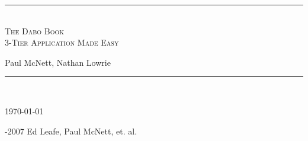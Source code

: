 \documentclass[letterpaper,10pt]{RevisedBook}
\newcommand{\titlerule}{\rule{\linewidth}{1.5mm}}
\renewcommand{\title}{The Dabo Book}				%
\newcommand{\subtitle}{3-Tier Application Made Easy}	%
\renewcommand{\author}{Paul McNett, Nathan Lowrie}					%
\newcommand{\copyrightHolder}{Ed Leafe, Paul McNett, et. al.}	%
\begin{document}
\frontmatter									%

\begin{titlepage}
    \thispagestyle{empty}
    \begin{center}
    \end{center}
    \begin{center}
        \titlerule\\[3mm]
        \Huge \textsc{\title\\\subtitle}\\[5mm]		%
        \begin{center}
		\huge \author\\[3.5mm]						%
    	\end{center}
       	\titlerule\\
    \end{center}
    \scriptsize \today
    \begin{center}
        -2007 \copyrightHolder			%
    \end{center}
\end{titlepage}

\pagestyle{fancy}                         %
\end{document}
